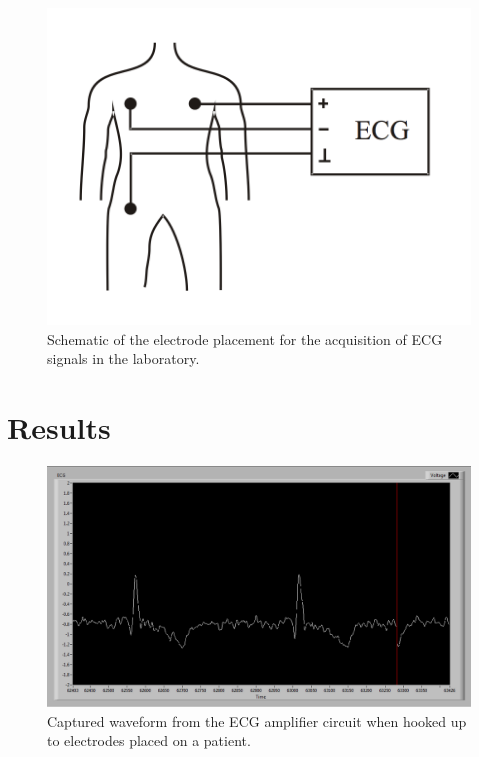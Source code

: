 \documentclass[pdftex,12pt,letterpaper]{article}
\begin{document}
\begin{figure}[H]
\begin{center}
\includegraphics[scale=.5]{setup.png}
\caption{Schematic of the electrode placement for the acquisition of ECG signals in the laboratory.}
\label{fig:setup}
\end{center}
\end{figure}

\section{Results}

\begin{figure}[H]
\begin{center}
\includegraphics[scale=.4]{ECG_real.png}
\caption{Captured waveform from the ECG amplifier circuit when hooked up to electrodes placed on a patient.}
\label{fig:ECG}
\end{center}
\end{figure}
\end{document}
